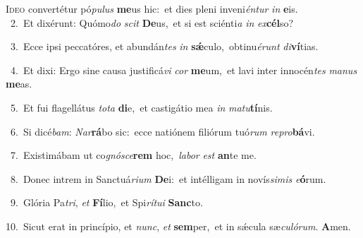 \lettrine{\initial\textcolor{\initialcolor}{I}}{deo} convertétur pó\-\textit{pu}\-\textit{lus} \textbf{me}\-us hic:~\star et dies pleni inveni\-\textit{én}\-\textit{tur} \textit{in} \textbf{e}\-is.\\
{\numbfont\textcolor{\numbcolor}{~2.}}~Et dixérunt: Quómo\textit{do} \textit{scit} \textbf{De}\-us,~\star et si est sciénti\textit{a} \textit{in} \textit{ex}\-\textbf{cél}so?\par
{\numbfont\textcolor{\numbcolor}{~3.}}~Ecce ipsi peccatóres, et abundán\textit{tes} \textit{in} \textbf{sǽ}\-culo,~\star obtinu\-\textit{é}\-\textit{runt} \textit{di}\-\textbf{ví}tias.\par
{\numbfont\textcolor{\numbcolor}{~4.}}~Et dixi: Ergo sine causa justificá\textit{vi} \textit{cor} \textbf{me}\-um,~\star et lavi inter innocén\textit{tes} \textit{ma}\-\textit{nus} \textbf{me}\-as.\par
{\numbfont\textcolor{\numbcolor}{~5.}}~Et fui flagellátus \textit{to}\-\textit{ta} \textbf{di}\-e,~\star et castigátio mea \textit{in} \textit{ma}\-\textit{tu}\textbf{tí}nis.\par
{\numbfont\textcolor{\numbcolor}{~6.}}~Si dicé\-\textit{bam}\-: \textit{Nar}\-\textbf{rá}bo sic:~\star ecce natiónem filiórum tuó\textit{rum} \textit{re}\-\textit{pro}\textbf{bá}vi.\par
{\numbfont\textcolor{\numbcolor}{~7.}}~Existimábam ut co\-\textit{gnó}\-\textit{sce}\textbf{rem} hoc,~\star \textit{la}\-\textit{bor} \textit{est} \textbf{an}\-te me.\par
{\numbfont\textcolor{\numbcolor}{~8.}}~Donec intrem in Sanctuá\-\textit{ri}\-\textit{um} \textbf{De}\-i:~\star et intélligam in novís\-\textit{si}\-\textit{mis} \textit{e}\-\textbf{ó}rum.\par
{\numbfont\textcolor{\numbcolor}{~9.}}~Glória Pa\-\textit{tri}\-, \textit{et} \textbf{Fí}\-lio,~\star et Spi\-\textit{rí}\-\textit{tu}\textit{i} \textbf{Sanc}\-to.\par
{\numbfont\textcolor{\numbcolor}{10.}}~Sicut erat in princípio, et \textit{nunc}\-, \textit{et} \textbf{sem}\-per,~\star et in sǽcula sæ\-\textit{cu}\-\textit{ló}\textit{rum}. \textbf{A}\-men.\par
